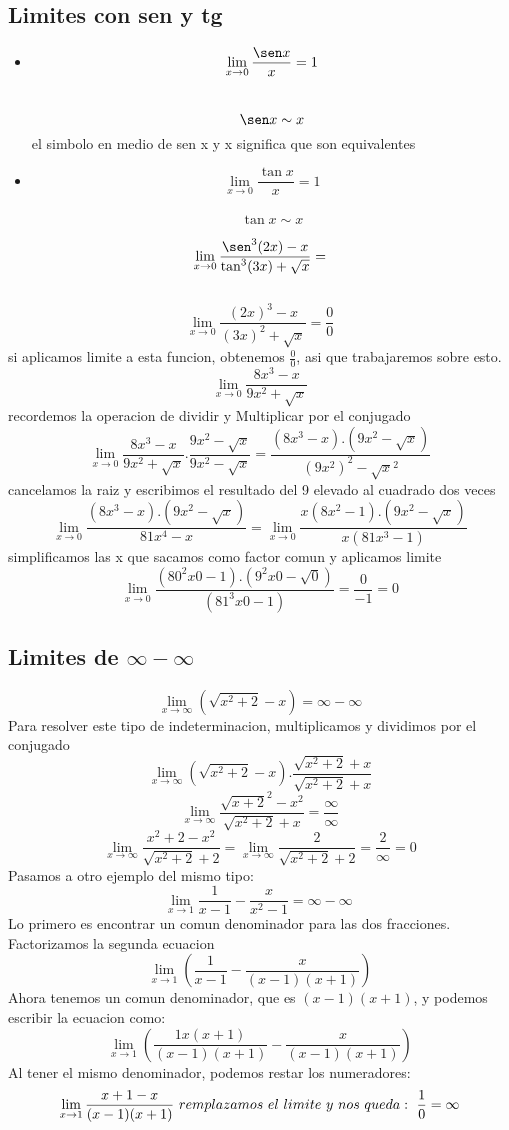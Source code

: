 \documentclass{article}
\begin{document}
\subsection{Limites con sen y tg}

\begin{itemize}
    \item $$\lim_{x \to 0} \frac{\sen x}{x} = 1$$ \ $$\sen x \sim x $$  \center el simbolo en medio de sen x y x significa que son equivalentes
    \item $$\lim_{x \to 0} \frac{\tan x}{x} = 1$$ \ $$\tan x \sim x $$ 
\end{itemize}
\begin{center}
$$\lim_{x \to 0} \frac{\sen^3 (2x) - x}{\tan^3(3x) + \sqrt{x}} =  $$ \ 
$$\lim_{x \to 0} \frac{(2x)^3 - x}{(3x)^2 + \sqrt{x}} = \frac{0}{0}$$  si aplicamos limite a esta funcion, obtenemos $\frac{0}{0}$, asi que trabajaremos sobre esto.
$$\lim_{x \to 0} \frac{8x^3 - x}{9x^2 + \sqrt{x}}$$   recordemos la operacion de dividir y Multiplicar por el conjugado 
$$\lim_{x \to 0} \frac{8x^3 - x}{9x^2 + \sqrt{x}} . \frac{ 9x^2 - \sqrt{x}}{9x^2 - \sqrt{x}} = \frac{(8x^3 - x). (9x^2 - \sqrt{x})}{(9x^2)^2 - \sqrt{x}^2}$$ cancelamos la raiz y escribimos el resultado del 9 elevado al cuadrado dos veces
$$\lim_{x \to 0} \frac{(8x^3 - x). (9x^2 - \sqrt{x})}{81x^4 - x} = \lim_{x \to 0} \frac{x(8x^2 - 1). (9x^2 - \sqrt{x})}{x(81x^3 - 1)}$$ simplificamos las x que sacamos como factor comun y aplicamos limite 
$$\lim_{x \to 0} \frac{(80^2x0 - 1). (9^2x0 - \sqrt{0})}{(81^3x0 - 1)} = \frac{0}{-1} = 0$$
\end{center}
\subsection{Limites de $\infty - \infty$}
$$ \lim_{x \to \infty} (\sqrt{x^2 +2} - x) = \infty - \infty $$
Para resolver este tipo de indeterminacion, multiplicamos y dividimos por el conjugado
$$ \lim_{x \to \infty } (\sqrt{x^2 +2} - x) . \frac{\sqrt{x^2+2}+x}{\sqrt{x^2+2}+x} $$
$$ \lim_{x \to \infty} \frac{\sqrt{x+2}^2-x^2}{\sqrt{x^2+2}+x} = \frac{\infty}{\infty}$$
$$\lim_{x \to \infty} \frac{x^2+2 - x^2}{\sqrt{x^2+2}+2} = \lim_{x \to \infty} \frac{2}{\sqrt{x^2+2}+2} = \frac{2}{\infty} = 0$$
\newpage
Pasamos a otro ejemplo del mismo tipo:
$$ \lim_{x \to 1} \frac{1}{x-1} - \frac{x}{x^2-1} = \infty - \infty \ $$
Lo primero es encontrar un comun denominador para las dos fracciones. Factorizamos la segunda ecuacion
$$ \lim_{x \to 1} \left(\frac{1}{x-1} - \frac{x}{(x-1)(x+1)}\right) $$ 
Ahora tenemos un comun denominador, que es $(x-1)(x+1)$, y podemos escribir la ecuacion como:
$$ \lim_{ x \to 1 } \left(\frac{1x(x+1)}{(x-1)(x+1)} - \frac{x}{(x-1)(x+1)} \right)$$
Al tener el mismo denominador, podemos restar los numeradores: 
$$ \lim_{x \to 1} \frac{x+1-x}{(x-1)(x+1) } \text \ remplazamos \ el \ limite \ y \ nos \ queda: \ \frac{1}{0}= \infty$$
\end{document}
